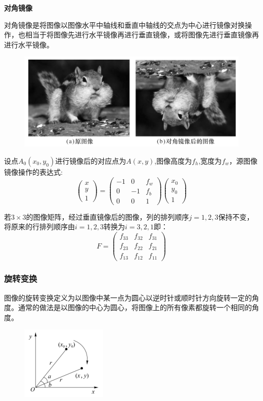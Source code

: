 \documentclass[11pt]{article}
\begin{document}
\textbf{对角镜像}

对角镜像是将图像以图像水平中轴线和垂直中轴线的交点为中心进行镜像对换操作，也相当于将图像先进行水平镜像再进行垂直镜像，或将图像先进行垂直镜像再进行水平镜像。
\begin{figure}
	\centering
	\includegraphics[width=0.32\textheight]{16}
\end{figure}

设点$A_0(x_0,y_0)$进行镜像后的对应点为$A(x,y)$,图像高度为$f_h$,宽度为$f_w$，源图像镜像操作的表达式:
$$\begin{pmatrix}x \\y \\1 \end{pmatrix}=\begin{pmatrix}-1 & 0 & f_w \\ 0 & -1 & f_b\\ 0 & 0 & 1\end{pmatrix}\begin{pmatrix}x_0 \\ y_0 \\ 1\end{pmatrix}$$

若$3\times 3$的图像矩阵，经过垂直镜像后的图像，列的排列顺序$j=1,2,3$保持不变，将原来的行排列顺序由$i = 1,2,3$转换为$i = 3,2,1$即：
$$F = \begin{pmatrix}f_{33} & f_{32} & f_{31}\\f_{23} & f_{22} & f_{21} \\f_{13} & f_{12} & f_{11} \end{pmatrix}$$
\subsubsection{旋转变换}
图像的旋转变换定义为以图像中某一点为圆心以逆时针或顺时针方向旋转一定的角度。通常的做法是以图像的中心为圆心，将图像上的所有像素都旋转一个相同的角度。

\begin{figure}
	\centering
	\includegraphics[width=0.32\textheight]{17}
\end{figure}
\end{document}
